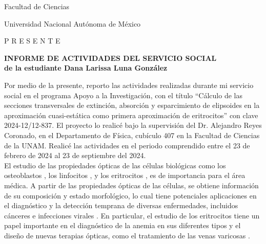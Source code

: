 \documentclass[9pt,letterpaper]{article}
\begin{document}
	Facultad de Ciencias
	
	Universidad Nacional Autónoma de México
	
	P R E S E N T E
	
	\vspace{1cm}
	
	\begin{center}
		\textbf{INFORME DE ACTIVIDADES DEL SERVICIO SOCIAL}\\
		\textbf{de la estudiante Dana Larissa Luna González}
	\end{center}
	
Por medio de la presente, reporto las actividades realizadas durante mi servicio social en el programa Apoyo a la Investigación, con el título ``Cálculo de las secciones transversales de extinción, absorción y esparcimiento de elipsoides en la aproximación cuasi-estática como primera aproximación de eritrocitos'' con clave 2024-12/12-837. El proyecto lo realicé bajo la supervisión del Dr. Alejandro Reyes Coronado, en el Departamento de Física, cubículo 407 en la Facultad de Ciencias de la UNAM. Realicé las actividades en el periodo comprendido entre el 23 de febrero de 2024 al 23 de septiembre del 2024. \\

El estudio de las propiedades ópticas de las células biológicas como los osteoblastos \cite{Osteoblastos}, los linfocitos \cite{Linfocitos}, y los eritrocitos \cite{Blood}, es de importancia para el área médica. A partir de las propiedades ópticas de las células, se obtiene información de su composición y estado morfológico, lo cual tiene potenciales aplicaciones en el diagnóstico y la detección temprana de diversas enfermedades, incluidos cánceres e infecciones virales \cite{Linfocitos}. En particular, el estudio de los eritrocitos tiene un papel importante en el diagnóstico de la anemia en sus diferentes tipos y el diseño de nuevas terapias ópticas, como el tratamiento de las venas varicosas \cite{Blood}.\\
\end{document}
